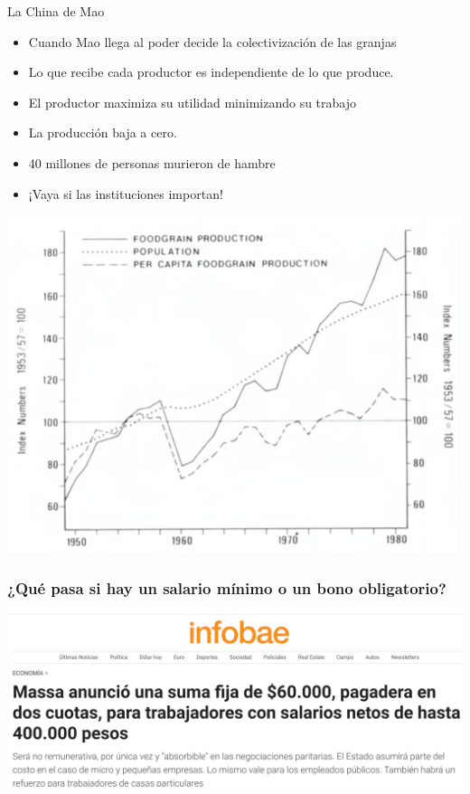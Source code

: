 \documentclass{beamer}
\begin{document}
\begin{frame}{La China de Mao }
\small
\begin{itemize}
    \item Cuando Mao llega al poder decide la colectivización de las granjas
    \item Lo que recibe cada productor es independiente de lo que produce. 
    \item El productor maximiza su utilidad minimizando su trabajo 
     \item La producción baja a cero.  
     \item 40 millones de personas murieron de hambre
     \item ¡Vaya si las instituciones importan! 
\end{itemize}
\begin{center}
    \includegraphics[scale=0.5]{../Figures/C19.18.png}
\end{center}

\end{frame}

\begin{frame}
\frametitle{¿Qué pasa si hay un salario mínimo o un bono obligatorio?}
\centering
\includegraphics[scale=0.33]{../Figures/M9.5.png}
\end{frame}
\end{document}

